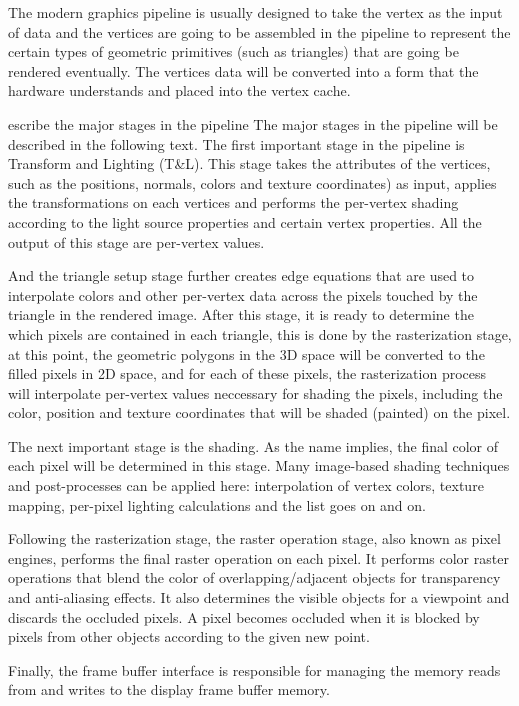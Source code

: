 The modern graphics pipeline is usually designed to take the vertex as the input of data and the vertices are going to be assembled in the pipeline to represent the certain types of geometric primitives (such as triangles) that are going be rendered eventually. The vertices data will be converted into a form that the hardware understands and placed into the vertex cache.  

escribe the major stages in the pipeline
The major stages in the pipeline will be described in the following text. The first important stage in the pipeline is Transform and Lighting (T\&L). This stage takes the attributes of the vertices, such as the positions, normals, colors and texture coordinates) as input, applies the transformations on each vertices and performs the per-vertex shading  according to the light source properties and certain vertex properties. All the output of this stage are per-vertex values.

And the triangle setup stage further creates edge equations that are used to interpolate colors and other per-vertex data across the pixels touched by the triangle in the rendered image. After this stage, it is ready to determine the which pixels are contained in each triangle, this is done by the rasterization stage, at this point, the geometric polygons in the 3D space will be converted to the filled pixels in 2D space, and for each of these pixels, the rasterization process will interpolate per-vertex values neccessary for shading the pixels, including the color, position and texture coordinates that will be shaded (painted) on the pixel.

The next important stage is the shading. As the name implies, the final color of each pixel will be determined in this stage. Many image-based shading techniques and post-processes can be applied here: interpolation of vertex colors, texture mapping, per-pixel lighting calculations and the list goes on and on. 

Following the rasterization stage, the raster operation stage, also known as pixel engines, performs the final raster operation on each pixel. It performs color raster operations that blend the color of overlapping/adjacent objects for transparency and anti-aliasing effects. It also determines the visible objects for a viewpoint and discards the occluded pixels. A pixel becomes occluded when it is blocked by pixels from other objects according to the given new point. 

Finally, the frame buffer interface is responsible for managing the memory reads from and writes to the display frame buffer memory.

